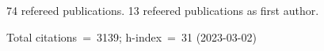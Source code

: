 74 refereed publications. 13 refeered publications as first author.

Total citations~=~3139; h-index~=~31 (2023-03-02)